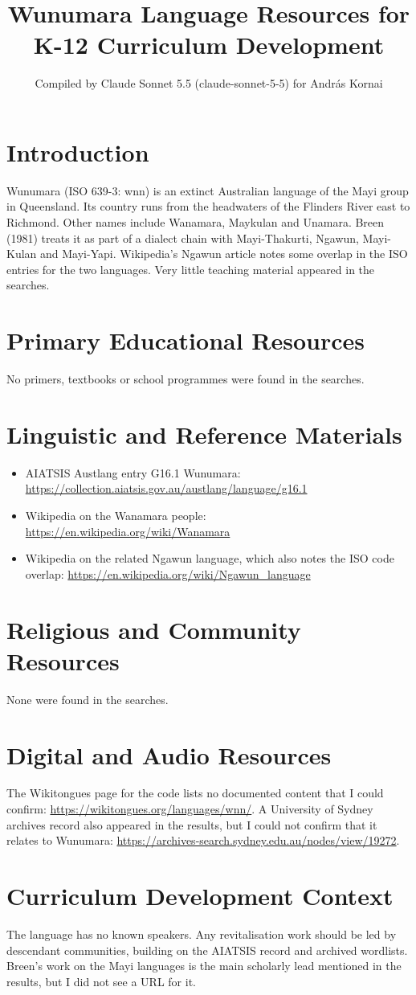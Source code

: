 \documentclass[12pt]{article}
\title{Wunumara Language Resources for K-12 Curriculum Development}
\author{Compiled by Claude Sonnet 5.5 (claude-sonnet-5-5) for Andr\'as Kornai}
\date{}
\begin{document}
\maketitle

\section{Introduction}
Wunumara (ISO 639-3: wnn) is an extinct Australian language of the Mayi group in Queensland. Its country runs from the headwaters of the Flinders River east to Richmond. Other names include Wanamara, Maykulan and Unamara. Breen (1981) treats it as part of a dialect chain with Mayi-Thakurti, Ngawun, Mayi-Kulan and Mayi-Yapi. Wikipedia's Ngawun article notes some overlap in the ISO entries for the two languages. Very little teaching material appeared in the searches.

\section{Primary Educational Resources}
No primers, textbooks or school programmes were found in the searches.

\section{Linguistic and Reference Materials}
\begin{itemize}
\item AIATSIS Austlang entry G16.1 Wunumara: \url{https://collection.aiatsis.gov.au/austlang/language/g16.1}
\item Wikipedia on the Wanamara people: \url{https://en.wikipedia.org/wiki/Wanamara}
\item Wikipedia on the related Ngawun language, which also notes the ISO code overlap: \url{https://en.wikipedia.org/wiki/Ngawun_language}
\end{itemize}

\section{Religious and Community Resources}
None were found in the searches.

\section{Digital and Audio Resources}
The Wikitongues page for the code lists no documented content that I could confirm: \url{https://wikitongues.org/languages/wnn/}. A University of Sydney archives record also appeared in the results, but I could not confirm that it relates to Wunumara: \url{https://archives-search.sydney.edu.au/nodes/view/19272}.

\section{Curriculum Development Context}
The language has no known speakers. Any revitalisation work should be led by descendant communities, building on the AIATSIS record and archived wordlists. Breen's work on the Mayi languages is the main scholarly lead mentioned in the results, but I did not see a URL for it.
\end{document}
